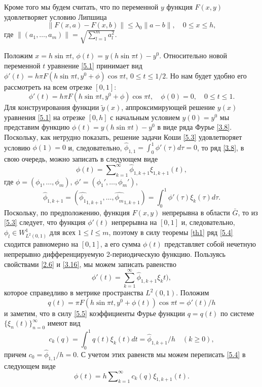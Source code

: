 \documentclass{article}
\numberwithin{equation}{section}
\theoremstyle{plain}
\theoremstyle{definition}
\begin{document}
\begin{fulltext}
Кроме того мы будем считать, что по переменной $y$ функция $F(x,y)$ удовлетворяет условию Липшица
 \begin{equation}\label{5.2}
\|F(x,a)-F(x,b)\|\le \lambda_0\|a-b\|, \quad 0\le x \le h,
\end{equation}
где $\|(a_1,\ldots,a_m)\|=\sqrt{\sum_{l=1}^ma_l^2}$.

Положим  $x=h\sin\pi t$, $\phi(t)=y(h\sin\pi t)-y^0$. Относительно новой переменной $t$ уравнение \eqref{5.1}   принимает вид $\phi'(t)=h \pi F(h\sin\pi t,y^0+\phi)\cos\pi t$,  $0\le t\le 1/2$. Но нам будет удобно его рассмотреть на всем отрезке $[0,1]$:
\begin{equation}\label{5.3}
\phi'(t)=h\pi F(h\sin\pi t,y^0+\phi)\cos\pi t, \quad \phi(0)= 0,\quad 0\le t\le 1.
\end{equation}
     Для конструирования функции $\tilde y(x)$, аппроксимирующей решение $y(x)$ уравнения \eqref{5.1} на отрезке $[0,h]$ с начальным условием $y(0)=y^0$ мы представим функцию $\phi(t)=y(h\sin\pi t)-y^0$ в виде ряда Фурье \eqref{3.8}. Поскольку, как нетрудно показать, решение задачи Коши \eqref{5.3} удовлетворяет условию $\phi(1)= 0$ и, следовательно, $\hat \phi_{1,1}=\int_0^1\phi'(\tau)d\tau=0$, то ряд \eqref{3.8}, в свою очередь, можно записать в следующем виде
\begin{equation}\label{5.4}
\phi(t)=\sum\nolimits_{k=1}^\infty \hat \phi_{1,k+1}\xi_{1,k+1}(t),
\end{equation}
где $\phi=(\phi_1,\ldots,\phi_m)$, $\phi'=(\phi_1',\ldots,\phi_m')$,
\begin{equation}\label{5.5}
\hat \phi_{1,k+1}=(\widehat{\phi_1}_{1,k+1},\ldots,\widehat{\phi_m}_{1,k+1})=\int_{0}^1 \phi'(\tau)\xi_k(\tau)d\tau.
\end{equation}
 Поскольку, по предположению, функция $F(x,y)$ непрерывна в области $\bar G$, то из \eqref{5.3} следует, что  функция $\phi'(t)$ непрерывна на $[0,1]$ и, следовательно, $\phi_l\in W_{L^2(0,1)}^1$ для всех $1\le l\le m$, поэтому в силу теоремы \ref{th1} ряд \eqref{5.4} сходится равномерно  на $[0,1]$, а его сумма $\phi(t)$ представляет собой нечетную непрерывно дифференцируемую  2-периодическую функцию. Пользуясь свойствами \eqref{2.6} и \eqref{3.16},  мы можем записать равенство
\begin{equation}\label{5.6}
\phi'(t)=\sum_{k=1}^\infty \hat \phi_{1,k+1}\xi_kt),
\end{equation}
 которое справедливо в метрике пространства $L^2(0,1)$.
Положим
$$q(t)=\pi F(h\sin\pi t,y^0+\phi(t))\cos\pi t=\phi'(t)/h$$
и заметим, что в силу  \eqref{5.5}  коэффициенты Фурье функции $q=q(t)$ по системе  $\{\xi_{n}(t)\}_{n=0}^\infty$ имеют вид
\begin{equation}\label{5.7}
 c_k(q)=\int_{0}^1 q(t)\xi_{k}(t)dt=\hat \phi_{1,k+1}/h \quad (k\ge0),
\end{equation}
причем $c_0=\hat \phi_{1,1}/h=0$. С учетом этих равенств мы можем переписать \eqref{5.4} в следующем виде
\begin{equation}\label{5.8}
\phi(t)=  h\sum\nolimits_{k=1}^\infty c_k(q){\xi}_{1,k+1}(t).
\end{equation}




\end{fulltext}
\end{document}
